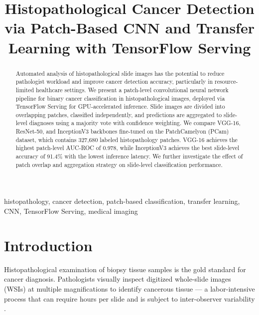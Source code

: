 \documentclass[conference]{IEEEtran}
\begin{document}
\title{Histopathological Cancer Detection via Patch-Based CNN and Transfer Learning with TensorFlow Serving}

\author{
}

\maketitle

\begin{abstract}
Automated analysis of histopathological slide images has the potential to reduce pathologist workload and improve cancer detection accuracy, particularly in resource-limited healthcare settings. We present a patch-level convolutional neural network pipeline for binary cancer classification in histopathological images, deployed via TensorFlow Serving for GPU-accelerated inference. Slide images are divided into overlapping patches, classified independently, and predictions are aggregated to slide-level diagnoses using a majority vote with confidence weighting. We compare VGG-16, ResNet-50, and InceptionV3 backbones fine-tuned on the PatchCamelyon (PCam) dataset, which contains 327,680 labeled histopathology patches. VGG-16 achieves the highest patch-level AUC-ROC of 0.978, while InceptionV3 achieves the best slide-level accuracy of 91.4\% with the lowest inference latency. We further investigate the effect of patch overlap and aggregation strategy on slide-level classification performance.
\end{abstract}

\begin{IEEEkeywords}
histopathology, cancer detection, patch-based classification, transfer learning, CNN, TensorFlow Serving, medical imaging
\end{IEEEkeywords}

\section{Introduction}

Histopathological examination of biopsy tissue samples is the gold standard for cancer diagnosis. Pathologists visually inspect digitized whole-slide images (WSIs) at multiple magnifications to identify cancerous tissue — a labor-intensive process that can require hours per slide and is subject to inter-observer variability \cite{elmore2015diagnostic}.
\end{document}

